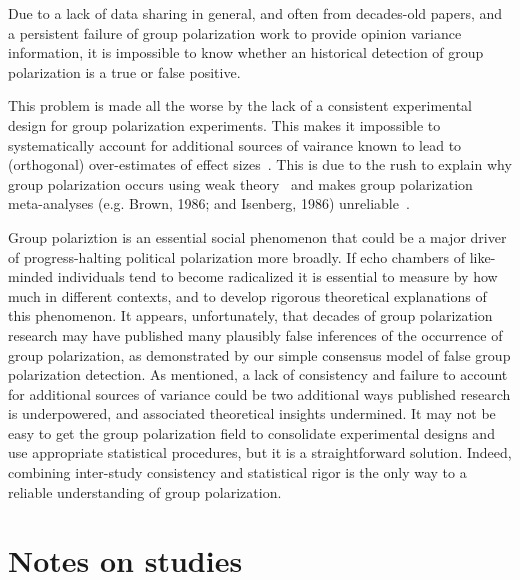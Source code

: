 \documentclass[11pt, letterpaper]{article}
\begin{document}
Due to a lack of data sharing in general, and often from decades-old papers, and a persistent 
failure of group polarization work to provide opinion variance information, 
it is impossible to know whether an historical detection of group polarization
is a true or false positive. 

This problem is made all the worse by the lack of a consistent experimental design for group
polarization experiments. This makes it impossible to systematically account for
additional sources of vairance known to lead to (orthogonal) over-estimates
of effect sizes~\cite{Yarkoni2021}. This is due to the rush to explain why 
group polarization occurs using weak theory~\cite{Cartwright1971,Cartwright1973} and makes
group polarization meta-analyses (e.g. Brown, 1986; and Isenberg, 1986)\nocite{Brown1986,Isenberg1986}
unreliable~\cite{Meehl1990,Meehl1997}.

Group polariztion is an essential social phenomenon that could be a major driver of
progress-halting political polarization more broadly. If echo chambers of like-minded
individuals tend to become radicalized it is essential to measure by how much
in different contexts, and to develop rigorous theoretical explanations of
this phenomenon. It appears, unfortunately, that decades of group polarization
research may have published many plausibly false inferences of the
occurrence of group polarization, as demonstrated by our simple consensus
model of false group polarization detection. As mentioned, a lack of
consistency and failure to account for additional sources of variance could
be two additional ways published research is underpowered, and associated
theoretical insights undermined. It may not be easy to get the group polarization field to 
consolidate experimental designs and use appropriate statistical procedures,
but it is a straightforward solution. Indeed, combining inter-study consistency and statistical
rigor is the only way to a reliable understanding of group polarization.



\setlength{\bibleftmargin}{.125in}
\setlength{\bibindent}{-\bibleftmargin}



\appendix

\section{Notes on studies}
\end{document}
